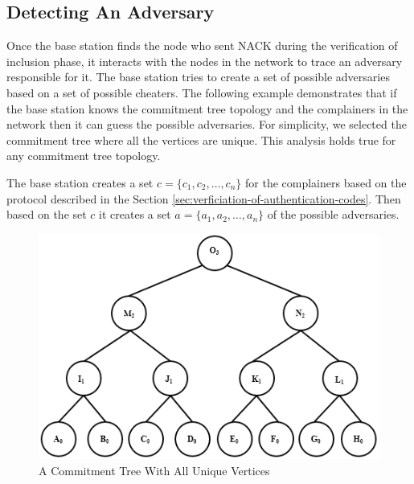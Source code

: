 	\subsection{Detecting An Adversary}
		Once the base station finds the node who sent NACK during the verification of inclusion phase, it interacts with the nodes in the network to trace an adversary responsible for it. 
		The base station tries to create a set of possible adversaries based on a set of possible cheaters.
		The following example demonstrates that if the base station knows the commitment tree topology and the complainers in the network then it can guess the possible adversaries.
		For simplicity, we selected the commitment tree where all the vertices are unique. 
		This analysis holds true for any commitment tree topology. 
		\begin{exmp}
			The base station creates a set $c=\{c_{1},c_{2} , \dotsc, c_{n}\}$ for the complainers based on the protocol described in the Section \ref{sec:verficiation-of-authentication-codes}.
			Then based on the set $c$ it creates a set $a = \{a_{1},a_{2},\dotsc,a_{n}\}$ of the possible adversaries. 
			\begin{figure}[t]
				\centering
				\includegraphics{images/possible-cheaters.png}
				\caption{A Commitment Tree With All Unique Vertices}
				\label{fig:cheating}
			\end{figure}


\end{exmp}
